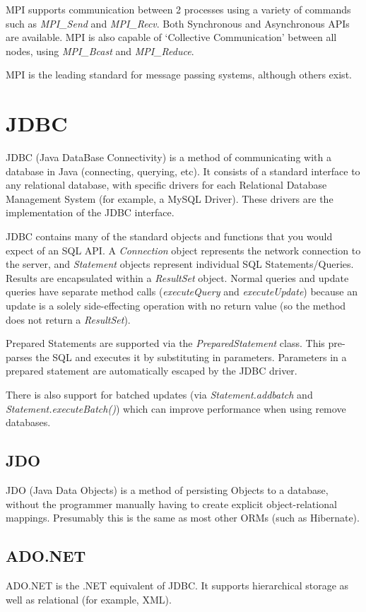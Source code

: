 \documentclass{article}
\begin{document}
MPI supports communication between 2 processes using a variety of commands such as \textit{MPI\_Send} and \textit{MPI\_Recv}. Both Synchronous and Asynchronous APIs are available. MPI is also capable of `Collective Communication' between all nodes, using \textit{MPI\_Bcast} and \textit{MPI\_Reduce}.

MPI is the leading standard for message passing systems, although others exist. 

\section{JDBC}
JDBC (Java DataBase Connectivity) is a method of communicating with a database in Java (connecting, querying, etc). It consists of a standard interface to any relational database, with specific drivers for each Relational Database Management System (for example, a MySQL Driver). These drivers are the implementation of the JDBC interface. 

JDBC contains many of the standard objects and functions that you would expect of an SQL API. A \textit{Connection} object represents the network connection to the server, and \textit{Statement} objects represent individual SQL Statements/Queries. Results are encapsulated within a \textit{ResultSet} object. Normal queries and update queries have separate method calls (\textit{executeQuery} and \textit{executeUpdate}) because an update is a solely side-effecting operation with no return value (so the method does not return a \textit{ResultSet}).

Prepared Statements are supported via the \textit{PreparedStatement} class. This pre-parses the SQL and executes it by substituting in parameters. Parameters in a prepared statement are automatically escaped by the JDBC driver.

There is also support for batched updates (via \textit{Statement.addbatch} and \textit{Statement.executeBatch()}) which can improve performance when using remove databases. 

\subsection{JDO}
JDO (Java Data Objects) is a method of persisting Objects to a database, without the programmer manually having to create explicit object-relational mappings. Presumably this is the same as most other ORMs (such as Hibernate).

\subsection{ADO.NET}
ADO.NET is the .NET equivalent of JDBC. It supports hierarchical storage as well as relational (for example, XML). 
\end{document}
